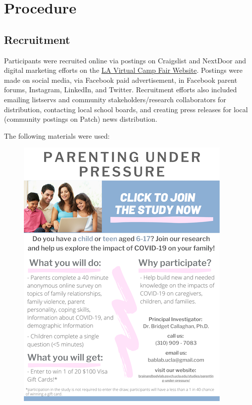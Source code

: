 \documentclass[]{book}
\begin{document}
\hypertarget{procedure}{%
\section{Procedure}\label{procedure}}

\hypertarget{recruitment}{%
\subsection{Recruitment}\label{recruitment}}

Participants were recruited online via postings on Craigslist and NextDoor and digital marketing efforts on the \href{https://www.vcampfair.com/brain-and-body-lab-ucla.html}{LA Virtual Camp Fair Website}. Postings were made on social media, via Facebook paid advertisement, in Facebook parent forums, Instagram, LinkedIn, and Twitter. Recruitment efforts also included emailing listservs and community stakeholders/research collaborators for distribution, contacting local school boards, and creating press releases for local (community postings on Patch) news distribution.

The following materials were used:

\begin{figure}
\centering
\includegraphics{images/pup_flyer.png}
\caption{}
\end{figure}
\end{document}
